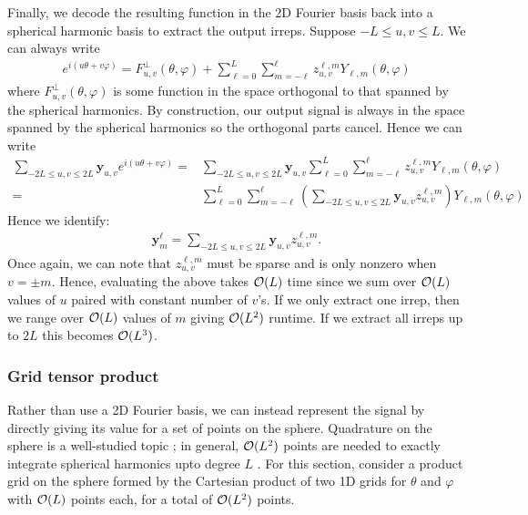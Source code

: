 Finally, we decode the resulting function in the 2D Fourier basis back into a spherical harmonic basis to extract the output irreps. Suppose $-L\leq u,v\leq L$. We can always write
\begin{align}
e^{i(u\theta+v\varphi)}=F^\perp_{u,v}(\theta,\varphi)+\sum_{\ell=0}^L\sum_{m=-\ell}^\ell z^{\ell,m}_{u,v}Y_{\ell,m}(\theta,\varphi)
\end{align}
where $F^\perp_{u,v}(\theta,\varphi)$ is some function in the space orthogonal to that spanned by the spherical harmonics. By construction, our output signal is always in the space spanned by the spherical harmonics so the orthogonal parts cancel. Hence we can write
\begin{align}
    \sum_{-2L\leq u,v\leq 2L}\mathbf{y}_{u,v}e^{i(u\theta+v\varphi)}= & \sum_{-2L\leq u,v\leq 2L}\mathbf{y}_{u,v}\sum_{\ell=0}^L\sum_{m=-\ell}^\ell z^{\ell,m}_{u,v}Y_{\ell,m}(\theta,\varphi)\\
    = & \sum_{\ell=0}^L\sum_{m=-\ell}^\ell \left(\sum_{-2L\leq u,v\leq 2L}\mathbf{y}_{u,v} z^{\ell,m}_{u,v}\right)Y_{\ell,m}(\theta,\varphi)
\end{align}
Hence we identify:
\begin{align}
\mathbf{y}^\ell_m=\sum_{-2L\leq u,v\leq 2L}\mathbf{y}_{u,v} z^{\ell,m}_{u,v}.
\end{align}
Once again, we can note that $z^{\ell,m}_{u,v}$ must be sparse and is only nonzero when $v=\pm m$. Hence, evaluating the above takes $\mathcal{O}(L)$ time since we sum over $\mathcal{O}(L)$ values of $u$ paired with constant number of $v$'s. If we only extract one irrep, then we range over $\mathcal{O}(L)$ values of $m$ giving $\mathcal{O}(L^2)$ runtime. If we extract all irreps up to $2L$ this becomes $\mathcal{O}(L^3)$.

\subsubsection{Grid tensor product}
\label{sec:grid_runtime}
Rather than use a 2D Fourier basis, we can instead represent the signal by directly giving its value for a set of points on the sphere. Quadrature on the sphere is a well-studied topic \citep{beentjes2015quadrature,lebedev1976quadratures}; in general, $\mathcal{O}(L^2)$ points are needed to exactly integrate spherical harmonics upto degree $L$ \citep{mclaren1963optimal}. For this section, consider a product grid on the sphere formed by the Cartesian product of two 1D grids for $\theta$ and $\varphi$ with $\mathcal{O}(L)$ points each, for a total of $\mathcal{O}(L^2)$ points. 

